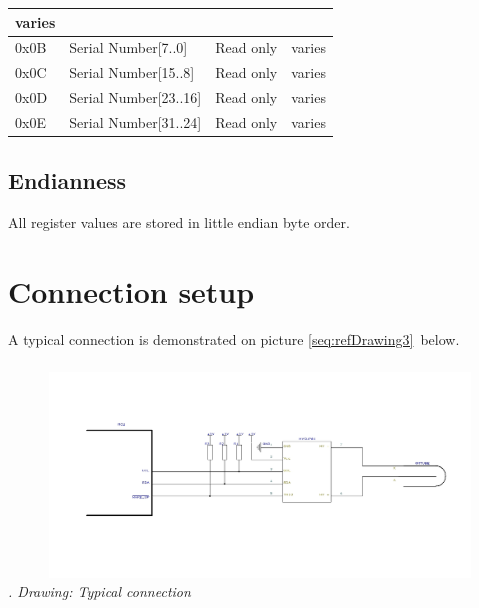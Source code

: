 \documentclass[a4paper]{article}
\newcounter{Drawing}
\renewcommand\theDrawing{\arabic{Drawing}}
\begin{document}
\begin{flushleft}
\begin{supertabular}{|m{0.7976598in}|m{1.9136599in}|m{1.3045598in}|m{1.1761599in}|}
{ varies}\\\hline
{ 0x0B} &
{ Serial Number[7..0]} &
{ Read only} &
{ varies}\\\hline
{ 0x0C} &
{ Serial Number[15..8]} &
{ Read only} &
{ varies}\\\hline
{ 0x0D} &
{ Serial Number[23..16]} &
{ Read only} &
{ varies}\\\hline
{ 0x0E} &
{ Serial Number[31..24]} &
{ Read only} &
{ varies}\\\hline
\end{supertabular}
\end{flushleft}

\bigskip

\subsection[Endianness]{ Endianness}
\hypertarget{RefHeadingToc9151801770043}{}{
All register values are stored in little endian byte order.}

\clearpage\section[Connection setup]{Connection setup}
\hypertarget{RefHeadingToc13004280169782}{}A typical connection is demonstrated on picture \ref{seq:refDrawing3}\ below.


\subsubsection[]{}
\begin{center}
\begin{minipage}{6.9252in}
{\itshape
 \includegraphics[width=6.6953in,height=2.1382in]{HVSUP01UM-img004.jpg} \newline
{\theDrawing\label{seq:refDrawing3}}. Drawing: Typical connection}
\end{minipage}
\end{center}
\end{document}
